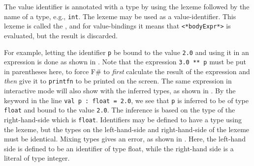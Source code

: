 \documentclass[fsharpNotes.tex]{subfiles}
\begin{document}
The value identifier is annotated with a type by using the \idx[:@\lstinline{:}]{\lexeme{:}} lexeme followed by the name of a type, e.g., \lstinline{int}. The \idx[\_@\lstinline{_}]{\lexeme{\_}} lexeme may be used as a value-identifier. This lexeme is called the , and for value-bindings it means that \lstinline[language=syntax]{<*bodyExpr*>} is evaluated, but the result is discarded.

For example, letting the identifier \lstinline!p! be bound to the value \lstinline!2.0! and using it in an expression is done as shown in .
%
%
Note that the expression \lstinline{3.0 ** p} must be put in parentheses here, to force F\# to \emph{first} calculate the result of the expression and \emph{then} give it to \lstinline{printfn} to be printed on the screen. The same expression in interactive mode will also show with the inferred types, as shown in .
%
%
By the  keyword in the line \lstinline!val p : float = 2.0!, we see that \lstinline!p! is inferred to be of type \lstinline!float! and bound to the value \lstinline!2.0!. The inference is based on the type of the right-hand-side which is \lstinline!float!.  Identifiers may be defined to have a type using the \lexeme{:} lexeme, but the types on the left-hand-side and right-hand-side of the \lexeme{=} lexeme must be identical. Mixing types gives an error, as shown in .
%
%
%
Here, the left-hand side is defined to be an identifier of type float, while the right-hand side is a literal of type integer.

\end{document}
